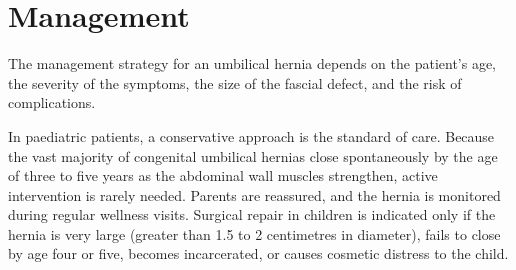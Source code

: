 \section*{Management}
The management strategy for an umbilical hernia depends on the patient's age, the severity of the symptoms, the size of the fascial defect, and the risk of complications.

In paediatric patients, a conservative approach is the standard of care. Because the vast majority of congenital umbilical hernias close spontaneously by the age of three to five years as the abdominal wall muscles strengthen, active intervention is rarely needed. Parents are reassured, and the hernia is monitored during regular wellness visits. Surgical repair in children is indicated only if the hernia is very large (greater than 1.5 to 2 centimetres in diameter), fails to close by age four or five, becomes incarcerated, or causes cosmetic distress to the child.

